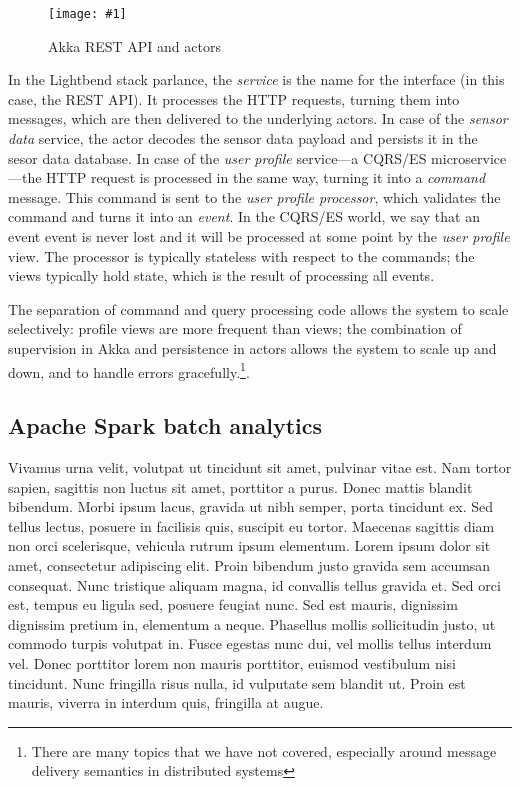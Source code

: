 \documentclass[a4paper, 10 pt, conference]{IEEEtran}
\newcommand{\fig}[3]{
  \begin{figure}[h]
    \begin{center}
        \caption{#3}
        \texttt{[image: \#1]}
        \label{fig:#2}
    \end{center}
  \end{figure}
}
\begin{document}
\fig{ri-akka-actors.png}{ri-akka-actors}{Akka REST API and actors}

In the Lightbend stack parlance, the \emph{service} is the name for the interface (in this case, the REST API). It processes the HTTP requests, turning them into messages, which are then delivered to the underlying actors. In case of the \emph{sensor data} service, the actor decodes the sensor data payload and persists it in the sesor data database. In case of the \emph{user profile} service---a CQRS/ES microservice---the HTTP request is processed in the same way, turning it into a \emph{command} message. This command is sent to the \emph{user profile processor}, which validates the command and turns it into an \emph{event}. In the CQRS/ES world, we say that an event event is never lost and it will be processed at some point by the \emph{user profile} view. The processor is typically stateless with respect to the commands; the views typically hold state, which is the result of processing all events.

The separation of command and query processing code allows the system to scale selectively: profile views are more frequent than views; the combination of supervision in Akka and persistence in actors allows the system to scale up and down, and to handle errors gracefully.\footnote{There are many topics that we have not covered, especially around message delivery semantics in distributed systems}.

\subsection{Apache Spark batch analytics}

Vivamus urna velit, volutpat ut tincidunt sit amet, pulvinar vitae est. Nam tortor sapien, sagittis non luctus sit amet, porttitor a purus. Donec mattis blandit bibendum. Morbi ipsum lacus, gravida ut nibh semper, porta tincidunt ex. Sed tellus lectus, posuere in facilisis quis, suscipit eu tortor. Maecenas sagittis diam non orci scelerisque, vehicula rutrum ipsum elementum. Lorem ipsum dolor sit amet, consectetur adipiscing elit. Proin bibendum justo gravida sem accumsan consequat. Nunc tristique aliquam magna, id convallis tellus gravida et. Sed orci est, tempus eu ligula sed, posuere feugiat nunc. Sed est mauris, dignissim dignissim pretium in, elementum a neque. Phasellus mollis sollicitudin justo, ut commodo turpis volutpat in. Fusce egestas nunc dui, vel mollis tellus interdum vel. Donec porttitor lorem non mauris porttitor, euismod vestibulum nisi tincidunt. Nunc fringilla risus nulla, id vulputate sem blandit ut. Proin est mauris, viverra in interdum quis, fringilla at augue.
\end{document}
